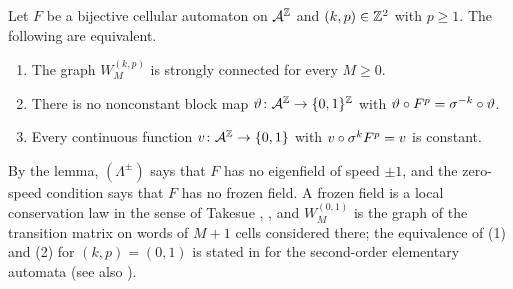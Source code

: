 \begin{lemma}\label{cl:lem:eigen}
Let $F$ be a bijective cellular automaton on $\mathcal{A}^{\mathbb{Z}}$ and $(k,p)\in\mathbb{Z}^2$ with $p\ge1$. The following are equivalent.
\begin{enumerate}
\item[(1)] The graph $W^{(k,p)}_M$ is strongly connected for every $M\ge0$.
\item[(2)] There is no nonconstant block map $\vartheta\colon\mathcal{A}^{\mathbb{Z}}\to\{0,1\}^{\mathbb{Z}}$ with $\vartheta\circ F^p=\sigma^{-k}\circ\vartheta$.
\item[(3)] Every continuous function $v\colon\mathcal{A}^{\mathbb{Z}}\to\{0,1\}$ with $v\circ\sigma^kF^p=v$ is constant.
\end{enumerate}
\end{lemma}

By the lemma, $(\Lambda^{\pm})$ says that $F$ has no eigenfield of speed $\pm1$, and the zero-speed condition says that $F$ has no frozen field. A frozen field is a local conservation law in the sense of Takesue \cite{Takesue1987}, \cite[Section~4]{Takesue1989}, and $W^{(0,1)}_M$ is the graph of the transition matrix on words of $M+1$ cells considered there; the equivalence of (1) and (2) for $(k,p)=(0,1)$ is stated in \cite[Section~4]{Takesue1989} for the second-order elementary automata (see also \cite[Proposition~4.1]{HT1991}).
